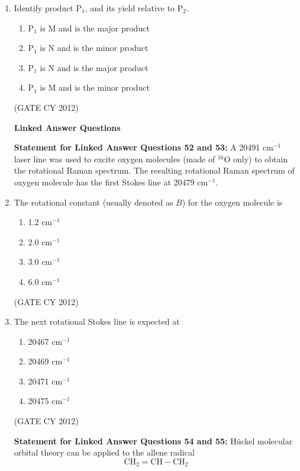 \documentclass[12pt]{article}
\begin{document}
\begin{enumerate}
\item Identify product P$_1$, and its yield relative to P$_2$.

\begin{enumerate}
    \item P$_1$ is M and is the major product
    \item P$_1$ is N and is the minor product
    \item P$_1$ is N and is the major product
    \item P$_1$ is M and is the minor product
\end{enumerate}
\hfill (GATE CY 2012)

\textbf{Linked Answer Questions}

\textbf{Statement for Linked Answer Questions 52 and 53:}
A 20491 cm$^{-1}$ laser line was used to excite oxygen molecules (made of $^{16}$O only) to obtain the rotational Raman spectrum. The resulting rotational Raman spectrum of oxygen molecule has the first Stokes line at 20479 cm$^{-1}$.

    \item The rotational constant (usually denoted as $B$) for the oxygen molecule is

    \begin{multicols}{2}
    \begin{enumerate}
        \item 1.2 cm$^{-1}$
        \item 2.0 cm$^{-1}$
        \item 3.0 cm$^{-1}$
        \item 6.0 cm$^{-1}$
    \end{enumerate}
    \end{multicols}
    \hfill (GATE CY 2012)

    \item The next rotational Stokes line is expected at

    \begin{multicols}{2}
    \begin{enumerate}
        \item 20467 cm$^{-1}$
        \item 20469 cm$^{-1}$
        \item 20471 cm$^{-1}$
        \item 20475 cm$^{-1}$
    \end{enumerate}
    \end{multicols}
    \hfill (GATE CY 2012)


\textbf{Statement for Linked Answer Questions 54 and 55:}
Hückel molecular orbital theory can be applied to the allene radical
\[
\text{CH}_2=\text{CH}-\text{CH}_2
\]


\end{enumerate}
\end{document}
